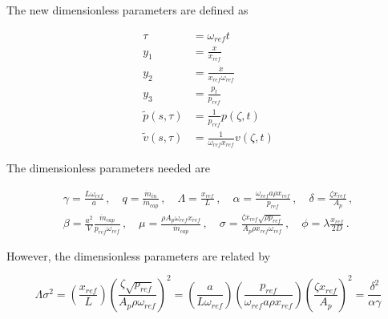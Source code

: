 The new dimensionless parameters are defined as

\begin{equation*}
\begin{split}
    \tau &= \omega_{ref} t \\
    y_1 &= \frac{x}{x_{ref}} \\
    y_2 &= \frac{\dot{x}}{x_{ref} \omega_{ref}} \\
    y_3 &= \frac{p_t}{p_{ref}} \\
    \tilde{p}(s,\tau) &= \frac{1}{p_{ref}} p(\zeta,t) \\
    \tilde{v}(s,\tau) &= \frac{1}{\omega_{ref} x_{ref}} v(\zeta,t) 
\end{split}
\end{equation*}

The dimensionless parameters needed are

\begin{equation*}
\begin{split}
    \gamma = \frac{L \omega_{ref}}{a} \, , \quad
    q = \frac{\dot{m}_{in}}{\dot{m}_{cap}} \, , \quad
    \Lambda = \frac{x_{ref}}{L} \, , \quad
    \alpha = \frac{\omega_{ref} a \rho x_{ref}}{p_{ref}} \, , \quad
    \delta = \frac{\zeta x_{ref}}{A_p}
    \, , \\ %
    \beta = \frac{a^2}{V} \frac{\dot{m}_{cap}}{p_{ref} \omega_{ref}} \, , \quad
    \mu = \frac{\rho A_p \omega_{ref} x_{ref}}{\dot{m}_{cap}} \, , \quad
    \sigma = \frac{\zeta x_{ref} \sqrt{\rho p_{ref}}}{A_p \rho x_{ref} \omega_{ref}} \, , \quad
    \phi = \lambda \frac{x_{ref}}{2D} \, .
\end{split}
\end{equation*}

However, the dimensionless parameters are related by

\begin{equation*}
    \Lambda \sigma^2 = \left( \frac{x_{ref}}{L} \right) \left( \frac{\zeta \sqrt{p_{ref}}}{A_p \rho \omega_{ref}} \right)^2 = \left( \frac{a}{L \omega_{ref}} \right) \left( \frac{p_{ref}}{\omega_{ref} a \rho x_{ref}} \right) \left( \frac{\zeta x_{ref}}{A_p} \right)^2 = \frac{\delta^2}{\alpha \gamma}
\end{equation*}

